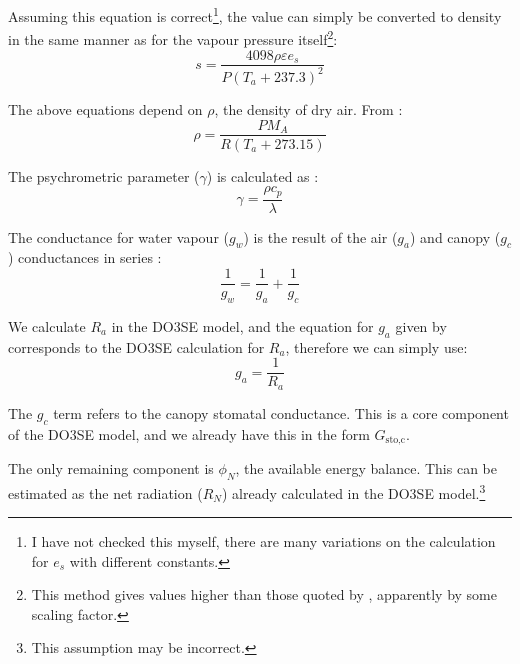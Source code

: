 \documentclass[a4paper]{article}
\begin{document}
Assuming this equation is correct\footnote{I have not checked this myself, there are many variations 
on the calculation for $e_s$ with different constants.}, the value can simply be converted to 
density in the same manner as for the vapour pressure itself\footnote{This method gives values 
    higher than those quoted by \citet[p.~408]{thornley90}, apparently by some scaling factor.}:
\begin{equation}
s = \frac{4098 \rho \varepsilon e_s}{P(T_a + 237.3)^2}
\end{equation}

The above equations depend on $\rho$, the density of dry air.  From \citet[p.~12]{monteith90}:
\begin{equation}
\rho = \frac{P M_A}{R (T_a + 273.15)}
\end{equation}

The psychrometric parameter ($\gamma$) is calculated as \citet[p.~407]{thornley90}:
\begin{equation}
\gamma = \frac{\rho c_p}{\lambda}
\end{equation}

The conductance for water vapour ($g_w$) is the result of the air ($g_a$) and canopy ($g_c$) 
    conductances in series \citet[p.~407]{thornley90}:
\begin{equation}
\frac{1}{g_w} = \frac{1}{g_a} + \frac{1}{g_c}
\end{equation}

We calculate $R_a$ in the DO3SE model, and the equation for $g_a$ given by 
\citet[p.~415]{thornley90} corresponds to the DO3SE calculation for $R_a$, therefore we can simply 
use:
\begin{equation}
g_a = \frac{1}{R_a}
\end{equation}

The $g_c$ term refers to the canopy stomatal conductance.  This is a core component of the DO3SE 
model, and we already have this in the form $G_{\text{sto,c}}$.

The only remaining component is $\phi_N$, the available energy balance.  This can be estimated as 
the net radiation ($R_N$) already calculated in the DO3SE model.\footnote{This assumption may be 
    incorrect.}
\end{document}
